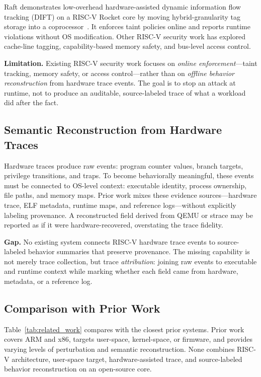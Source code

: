 Raft demonstrates low-overhead hardware-assisted dynamic information flow tracking (DIFT) on a RISC-V Rocket core by moving hybrid-granularity tag storage into a coprocessor~\cite{raft2023raid}. It enforces taint policies online and reports runtime violations without OS modification. Other RISC-V security work has explored cache-line tagging, capability-based memory safety, and bus-level access control.

\textbf{Limitation.} Existing RISC-V security work focuses on \emph{online enforcement}---taint tracking, memory safety, or access control---rather than on \emph{offline behavior reconstruction} from hardware trace events. The goal is to stop an attack at runtime, not to produce an auditable, source-labeled trace of what a workload did after the fact.

\subsection{Semantic Reconstruction from Hardware Traces}

Hardware traces produce raw events: program counter values, branch targets, privilege transitions, and traps. To become behaviorally meaningful, these events must be connected to OS-level context: executable identity, process ownership, file paths, and memory maps. Prior work mixes these evidence sources---hardware trace, ELF metadata, runtime maps, and reference logs---without explicitly labeling provenance. A reconstructed field derived from QEMU or strace may be reported as if it were hardware-recovered, overstating the trace fidelity.

\textbf{Gap.} No existing system connects RISC-V hardware trace events to source-labeled behavior summaries that preserve provenance. The missing capability is not merely trace collection, but trace \emph{attribution}: joining raw events to executable and runtime context while marking whether each field came from hardware, metadata, or a reference log.

\subsection{Comparison with Prior Work}

Table~\ref{tab:related_work} compares \rvmt with the closest prior systems. Prior work covers ARM and x86, targets user-space, kernel-space, or firmware, and provides varying levels of perturbation and semantic reconstruction. None combines RISC-V architecture, user-space target, hardware-assisted trace, and source-labeled behavior reconstruction on an open-source core.

